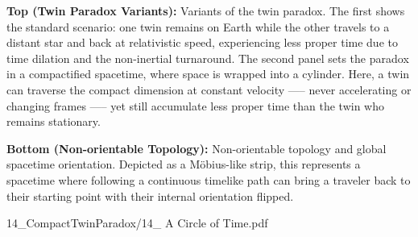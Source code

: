 \begin{SideNotePage}{
  \textbf{Top (Twin Paradox Variants):} Variants of the twin paradox. The first shows the standard scenario: one twin remains on Earth while the other travels to a distant star and back at relativistic speed, experiencing less proper time due to time dilation and the non-inertial turnaround. The second panel sets the paradox in a compactified spacetime, where space is wrapped into a cylinder. Here, a twin can traverse the compact dimension at constant velocity —-- never accelerating or changing frames —-- yet still accumulate less proper time than the twin who remains stationary. \par
  \textbf{Bottom (Non-orientable Topology):} Non-orientable topology and global spacetime orientation. Depicted as a Möbius-like strip, this represents a spacetime where following a continuous timelike path can bring a traveler back to their starting point with their internal orientation flipped.
}{14_CompactTwinParadox/14_ A Circle of Time.pdf}
\end{SideNotePage}
